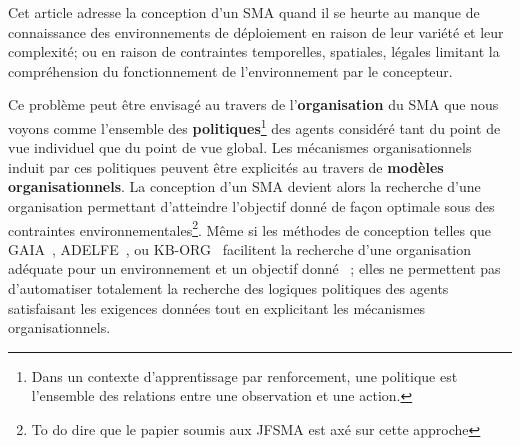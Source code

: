\documentclass[demonstration]{jfsma}
\newcounter{relation}
\begin{document}




%

Cet article adresse la conception d'un SMA quand il se heurte au manque de connaissance des environnements de déploiement en raison de leur variété et leur complexité; ou en raison de contraintes temporelles, spatiales, légales limitant la compréhension  du fonctionnement de l'environnement par le concepteur.

Ce problème peut être envisagé au travers de l'\textbf{organisation} du SMA que nous voyons comme l'ensemble des \textbf{politiques}\footnote{Dans un contexte d'apprentissage par renforcement, une politique est l'ensemble des relations entre une observation et une action.} des agents considéré tant du point de vue individuel que du point de vue global. Les mécanismes organisationnels induit par ces politiques peuvent être explicités au travers de \textbf{modèles organisationnels}.
La conception d'un SMA devient alors la recherche d'une organisation permettant d'atteindre l'objectif donné de façon optimale sous des contraintes environnementales\footnote{To do dire que le papier soumis aux JFSMA est axé sur cette approche}.
Même si les méthodes de conception telles que GAIA~\cite{Wooldridge2000,Cernuzzi2014}, ADELFE~\cite{Mefteh2015},
ou KB-ORG~\cite{Sims2008} facilitent la recherche d'une organisation adéquate pour un environnement et un objectif donné~\cite{Mefteh2013} ; elles ne permettent pas d'automatiser totalement la recherche des logiques politiques des agents satisfaisant les exigences données tout en explicitant les mécanismes organisationnels.
\end{document}
